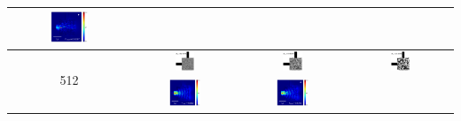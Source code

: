 \begin{table}[ht]
\begin{tabular}{|c|c|c|c|}
      \includegraphics[width=0.33\textwidth]{image/results/bend/MMA/visualize_field_fab_256.png} \\
    \hline
      \multirow{2}{*}{512} &
      \includegraphics[width=0.20\textwidth]{image/results/bend/MMA/visualize_eps_cont_512.png} &
      \includegraphics[width=0.20\textwidth]{image/results/bend/MMA/visualize_eps_disc_512.png} &
      \includegraphics[width=0.20\textwidth]{image/results/bend/MMA/visualize_eps_fab_512.png} \\
      \cline{2-4}
      &
      \includegraphics[width=0.33\textwidth]{image/results/bend/MMA/visualize_field_cont_512.png} &
      \includegraphics[width=0.33\textwidth]{image/results/bend/MMA/visualize_field_disc_512.png} &

\end{tabular}
\end{table}

